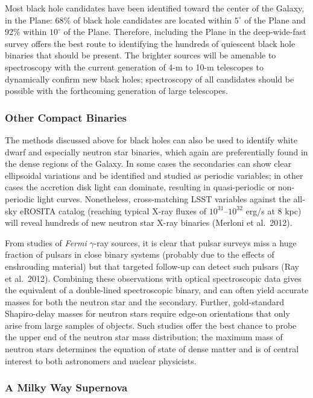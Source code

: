 Most black hole candidates have been identified toward the center of the Galaxy, in the Plane: 68\% of black hole candidates are located within $5^{\circ}$ of the Plane and 92\% within $10^{\circ}$ of the Plane. Therefore, including the Plane in the deep-wide-fast survey offers the best route to identifying the hundreds of quiescent black hole binaries that should be present. The brighter sources will be amenable to spectroscopy with the current generation of 4-m to 10-m telescopes to dynamically confirm new black holes; spectroscopy of all candidates should be possible with the forthcoming generation of large telescopes.

\subsubsection{Other Compact Binaries}

The methods discussed above for black holes can also be used to identify white dwarf and especially neutron star binaries, which again are preferentially found in the dense regions of the Galaxy.
In some cases the secondaries can show clear ellipsoidal variations and be identified and studied as periodic variables; in other cases the accretion disk light can dominate, resulting in quasi-periodic or
non-periodic light curves. Nonetheless, cross-matching LSST variables against the all-sky eROSITA catalog (reaching typical X-ray fluxes of $10^{31}$--$10^{32}$ erg/s at 8 kpc) will reveal hundreds of new neutron star X-ray binaries (Merloni et al.~2012). 

From studies of \emph{Fermi} $\gamma$-ray sources, it is clear that pulsar surveys miss a huge fraction of pulsars in close binary systems (probably due to the effects of enshrouding material) but that targeted follow-up can detect such pulsars (Ray et al.~2012). Combining these observations with optical spectroscopic data gives the equivalent of a double-lined spectroscopic binary, and can often yield accurate masses for both the neutron star and the secondary. Further, gold-standard Shapiro-delay masses for neutron stars require edge-on orientations that only arise
from large samples of objects. Such studies offer the best chance to probe the upper end of the neutron star mass distribution; the maximum mass of neutron stars determines the equation of state of dense matter and is of central interest to both astronomers and nuclear physicists.

\subsubsection{A Milky Way Supernova}


